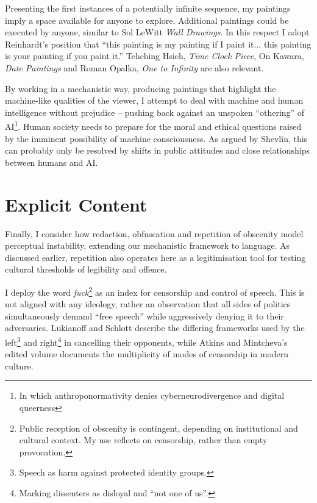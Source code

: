 \documentclass[12pt]{article}
\begin{document}
Presenting the first instances of a
potentially infinite sequence, my paintings imply a space available
for anyone to explore. Additional paintings could be executed by
anyone, similar to Sol LeWitt \emph{Wall Drawings}. In this respect I
adopt Reinhardt's position that ``this painting is my painting if I
paint it... this painting is your painting if you paint
it.''\autocite{abstract-painting-1960} Tehching Hsieh, \emph{Time Clock
  Piece}, On Kawara, \emph{Date Paintings} and Roman Opalka, \emph{One
  to Infinity} are also relevant.

By working in a mechanistic way, producing paintings that highlight
the machine-like qualities of the viewer, I attempt to deal with
machine and human intelligence without prejudice -- pushing back
against an unspoken ``othering'' of AI\footnote{In which anthroponormativity denies cyberneurodivergence and digital queerness}. Human society needs to prepare
for the moral and ethical
questions\autocite{chalmers1996conscious,metzinger2009egotunnel,bostrom2014ethics}
raised by the imminent possibility of machine consciousness. As argued by
Shevlin, this can probably only be
resolved by shifts in public attitudes and close relationships between
humans and AI.\autocite{shevlin2023consciousness}

\section{Explicit Content}
Finally, I consider how redaction, obfuscation and repetition of
obscenity model perceptual instability, extending our mechanistic
framework to language. As discussed earlier, repetition also operates
here as a legitimisation tool for testing cultural thresholds of
legibility and offence.


I deploy the word \emph{fuck}\footnote{Public reception of obscenity
  is contingent, depending on institutional and cultural context. My
  use reflects on censorship, rather than empty provocation.}  as an index
for censorship and control of speech. This is not aligned with any
ideology, rather an observation that all sides of politics
simultaneously demand ``free speech'' while aggressively denying it to
their adversaries. Lukianoff and Schlott\autocite[Chapters 6,
7]{lukianoff2023cancelling} describe the differing frameworks used by
the left\footnote{Speech as harm against protected identity groups.}
and right\footnote{Marking dissenters as disloyal and ``not one of
  us''.} in cancelling their opponents, while Atkins and Mintcheva's
edited volume documents the multiplicity of modes of censorship in
modern culture.\autocite{atkins2006censoring}
\end{document}
